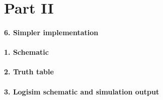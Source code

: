 \documentclass[12pt, tikz]{scrartcl}
\begin{document}
\section*{Part II}
\paragraph*{6. Simpler implementation} \hfill \newline
\paragraph*{1. Schematic} \hfill \newline
\paragraph*{2. Truth table} \hfill \newline
\paragraph*{3. Logisim schematic and simulation output} \hfill \newline
\end{document}

